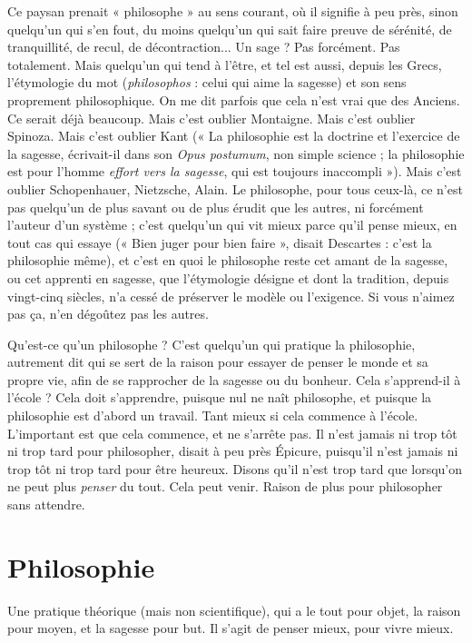 Ce paysan prenait « philosophe » au sens courant, où il signifie à peu près,
sinon quelqu'un qui s’en fout, du moins quelqu'un qui sait faire preuve de
sérénité, de tranquillité, de recul, de décontraction... Un sage ? Pas forcément.
Pas totalement. Mais quelqu’un qui tend à l'être, et tel est aussi, depuis les
Grecs, l’étymologie du mot ({\it philosophos} : celui qui aime la sagesse) et son sens
proprement philosophique. On me dit parfois que cela n’est vrai que des
Anciens. Ce serait déjà beaucoup. Mais c’est oublier Montaigne. Mais c’est
oublier Spinoza. Mais c’est oublier Kant (« La philosophie est la doctrine et
l'exercice de la sagesse, écrivait-il dans son {\it Opus postumum}, non simple
science ; la philosophie est pour l’homme {\it effort vers la sagesse}, qui est toujours
inaccompli »). Mais c’est oublier Schopenhauer, Nietzsche, Alain. Le philosophe,
pour tous ceux-là, ce n’est pas quelqu'un de plus savant ou de plus
érudit que les autres, ni forcément l’auteur d’un système ; c’est quelqu’un qui
vit mieux parce qu'il pense mieux, en tout cas qui essaye (« Bien juger pour
bien faire », disait Descartes : c’est la philosophie même), et c’est en quoi le
philosophe reste cet amant de la sagesse, ou cet apprenti en sagesse, que l’étymologie
désigne et dont la tradition, depuis vingt-cinq siècles, n’a cessé de préserver
le modèle ou l'exigence. Si vous n’aimez pas ça, n’en dégoûtez pas les
autres.

Qu'est-ce qu’un philosophe ? C’est quelqu'un qui pratique la philosophie,
autrement dit qui se sert de la raison pour essayer de penser le monde et sa
propre vie, afin de se rapprocher de la sagesse ou du bonheur. Cela s’apprend-il
à l'école ? Cela doit s’apprendre, puisque nul ne naît philosophe, et puisque
la philosophie est d’abord un travail. Tant mieux si cela commence à l’école.
L'important est que cela commence, et ne s'arrête pas. Il n’est jamais ni trop tôt
ni trop tard pour philosopher, disait à peu près Épicure, puisqu'il n’est jamais
ni trop tôt ni trop tard pour être heureux. Disons qu’il n’est trop tard que
lorsqu'on ne peut plus {\it penser} du tout. Cela peut venir. Raison de plus pour
philosopher sans attendre.

\section{Philosophie}
Une pratique théorique (mais non scientifique), qui a le
tout pour objet, la raison pour moyen, et la sagesse pour
but. Il s’agit de penser mieux, pour vivre mieux.

